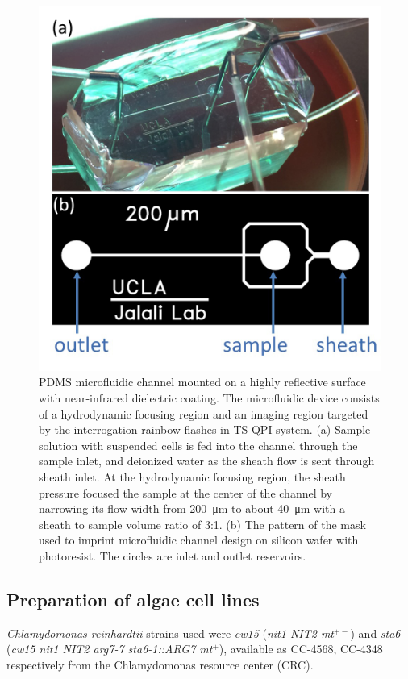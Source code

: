 \documentclass[aps,pra,reprint,superscriptaddress]{revtex4-1}
\begin{document}
\begin{figure}
\includegraphics[scale=0.2]{FigureChannel.jpg}
\caption{\label{fig:Channel} PDMS microfluidic channel mounted on a highly reflective surface with near-infrared dielectric coating. The microfluidic device consists of a hydrodynamic focusing region and an imaging region targeted by the interrogation rainbow flashes in TS-QPI system. (a) Sample solution with suspended cells is fed into the channel through the sample inlet, and deionized water as the sheath flow is sent through sheath inlet. At the hydrodynamic focusing region, the sheath pressure focused the sample at the center of the channel by narrowing its flow width from \SI{200}{\micro\meter} to about \SI{40}{\micro\meter} with a sheath to sample volume ratio of 3:1. (b) The pattern of the mask used to imprint microfluidic channel design on silicon wafer with photoresist. The circles are inlet and outlet reservoirs.}
\end{figure}

\subsection{Preparation of algae cell lines}

\textit{Chlamydomonas reinhardtii} strains used were \textit{cw15} (\textit{nit1 NIT2 mt$^{+-}$}) and \textit{sta6} (\textit{cw15 nit1 NIT2 arg7-7 sta6-1::ARG7 mt$^+$}), available as CC-4568, CC-4348 respectively from the Chlamydomonas resource center (CRC)\cite{minnesota2015chlamydomonas}.
\end{document}
